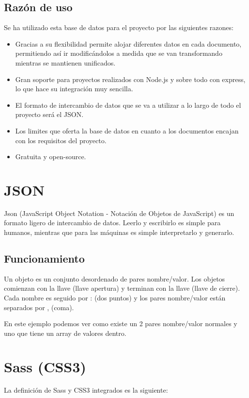 \subsection{Razón de uso}
Se ha utilizado esta base de datos para el proyecto por las siguientes razones:

\begin{itemize}
	\item Gracias a su flexibilidad permite alojar diferentes datos en cada documento, permitiendo así ir modificándolos a medida que se van transformando mientras se mantienen unificados.
	\item Gran soporte para proyectos realizados con Node.js y sobre todo con express, lo que hace su integración muy sencilla.
	\item El formato de intercambio de datos que se va a utilizar a lo largo de todo el proyecto será el JSON.
	\item Los limites que oferta la base de datos en cuanto a los documentos encajan con los requisitos del proyecto.
	\item Gratuita y open-source.
\end{itemize}

\section{JSON}
Json (JavaScript Object Notation - Notación de Objetos de JavaScript) es un formato ligero de intercambio de datos. Leerlo y escribirlo es simple para humanos, mientras que para las máquinas es simple interpretarlo y generarlo.

\subsection{Funcionamiento}
Un objeto es un conjunto desordenado de pares nombre/valor. Los objetos comienzan con la llave { (llave apertura) y terminan con la llave } (llave de cierre). Cada nombre es seguido por : (dos puntos) y los pares nombre/valor están separados por , (coma).


En este ejemplo podemos ver como existe un 2 pares nombre/valor normales y uno que tiene un array de valores dentro.


\section{Sass (CSS3)}
La definición de Sass y CSS3 integrados es la siguiente:


